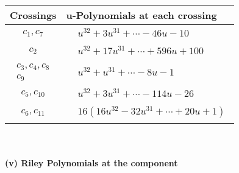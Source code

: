 \documentclass[1p]{elsarticle_modified}
\theoremstyle{definition}
\begin{document}
\begin{tabular}{m{50pt}|m{274pt}}
Crossings & \hspace{64pt}u-Polynomials at each crossing \\
\hline $$\begin{aligned}c_{1},c_{7}\end{aligned}$$&$\begin{aligned}
&u^{32}+3 u^{31}+\cdots-46 u-10
\end{aligned}$\\
\hline $$\begin{aligned}c_{2}\end{aligned}$$&$\begin{aligned}
&u^{32}+17 u^{31}+\cdots+596 u+100
\end{aligned}$\\
\hline $$\begin{aligned}c_{3},c_{4},c_{8}\\c_{9}\end{aligned}$$&$\begin{aligned}
&u^{32}+u^{31}+\cdots-8 u-1
\end{aligned}$\\
\hline $$\begin{aligned}c_{5},c_{10}\end{aligned}$$&$\begin{aligned}
&u^{32}+3 u^{31}+\cdots-114 u-26
\end{aligned}$\\
\hline $$\begin{aligned}c_{6},c_{11}\end{aligned}$$&$\begin{aligned}
&16(16 u^{32}-32 u^{31}+\cdots+20 u+1)
\end{aligned}$\\
\hline
\end{tabular}\\~\\
\newpage\renewcommand{\arraystretch}{1}
\flushleft \textbf{(v) Riley Polynomials at the component}\newline \\
\end{document}
